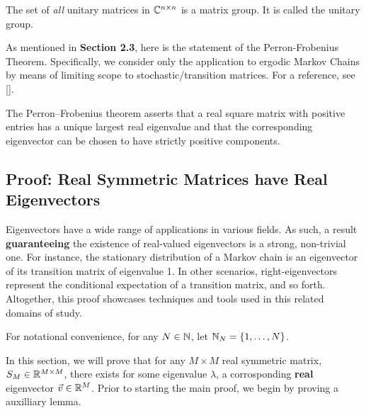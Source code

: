\begin{theorem}
The set of {\em all} unitary matrices in $\mathbb{C}^{n\times n}$ is a matrix group. It is called the {unitary group}.
\end{theorem}

As mentioned in \textbf{Section 2.3}, here is the statement of the Perron-Frobenius Theorem.
Specifically, we consider only the application to ergodic Markov Chains by means of limiting scope to stochastic/transition matrices.
For a reference, see [\cite{stone}].

\begin{theorem}
The Perron–Frobenius theorem asserts that a real square matrix with positive entries has a unique largest real eigenvalue and that the corresponding eigenvector can be chosen to have strictly positive components.
\end{theorem}


\newpage

\subsection{Proof: Real Symmetric Matrices have Real Eigenvectors}


Eigenvectors have a wide range of applications in various fields. As such, a result \textbf{guaranteeing} the existence of real-valued eigenvectors is a strong, non-trivial one. For instance, the stationary distribution of a Markov chain is an eigenvector of its transition matrix of eigenvalue 1. In other scenarios, right-eigenvectors represent the conditional expectation of a transition matrix, and so forth. Altogether, this proof showcases techniques and tools used in this related domains of study. \newline


 For notational convenience, for any $N \in \mathbb{N}$, let $\mathbb{N}_{N} = \{1,\dots,N\}$.


In this section, we will prove that for any $M \times M$ real symmetric matrix, $S_M \in \mathbb{R}^{M \times M}$, there exists for some eigenvalue $\lambda$, a corrosponding \textbf{real} eigenvector $\vec{v} \in \mathbb{R}^M$. Prior to starting the main proof, we begin by proving a auxilliary lemma. \newline


